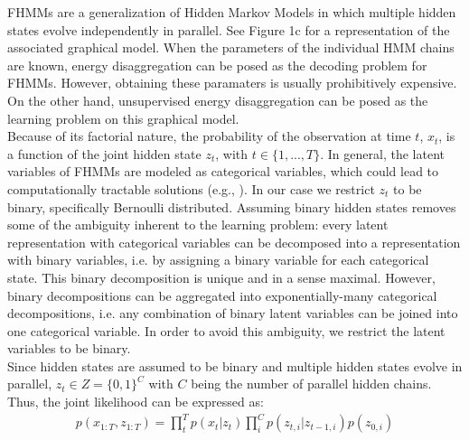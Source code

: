 FHMMs are a generalization of Hidden Markov Models in which multiple hidden states evolve independently in parallel. See Figure 1c for a representation of the associated graphical model. When the parameters of the individual HMM chains are known, energy disaggregation can be posed as the decoding problem for FHMMs. However, obtaining these paramaters is usually prohibitively expensive. On the other hand, unsupervised energy disaggregation can be posed as the learning problem on this graphical model.\\
Because of its factorial nature, the probability of the observation at time $t$, $x_t$, is a function of the joint hidden state $z_t$, with $t \in \{1,...,T\}$. In general, the latent variables of FHMMs are modeled as categorical variables, which could lead to computationally tractable solutions (e.g., \cite{jang2016categorical}). In our case we restrict $z_t$ to be binary, specifically Bernoulli distributed. Assuming binary hidden states removes some of the ambiguity inherent to the learning problem: every latent representation with categorical variables can be decomposed into a representation with binary variables, i.e. by assigning a binary variable for each categorical state. This binary decomposition is unique and in a sense maximal. However, binary decompositions can be aggregated into exponentially-many categorical decompositions, i.e. any combination of binary latent variables can be joined into one categorical variable. In order to avoid this ambiguity, we restrict the latent variables to be binary.\\
Since hidden states are assumed to be binary and multiple hidden states evolve in parallel, $z_t \in Z  = \{0,1\}^C$ with $C$ being the number of parallel hidden chains. Thus, the joint likelihood can be expressed as:
\begin{align}
p(x_{1:T},z_{1:T}) = \prod_t^T p(x_t|z_t)\prod_i^C p(z_{t,i}|z_{t-1,i})p(z_{0,i})
\end{align}

